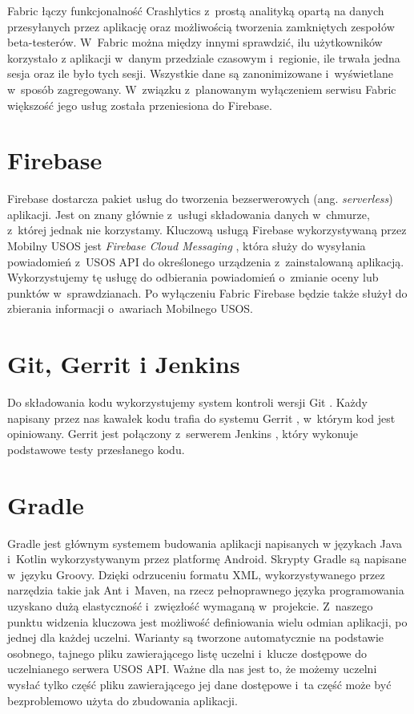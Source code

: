 \documentclass{pracamgr}
\begin{document}
Fabric \cite{fabric} łączy funkcjonalność Crashlytics z~prostą analityką opartą na
danych przesyłanych przez aplikację oraz możliwością tworzenia zamkniętych zespołów
beta-testerów. W~Fabric można między innymi sprawdzić, ilu użytkowników korzystało
z aplikacji w~danym przedziale czasowym i~regionie, ile trwała jedna sesja oraz
ile było tych sesji. Wszystkie dane są zanonimizowane i~wyświetlane w~sposób
zagregowany. W~związku z~planowanym wyłączeniem serwisu Fabric większość jego
usług została przeniesiona do Firebase.

\section{Firebase}

Firebase \cite{firebase} dostarcza pakiet usług do tworzenia bezserwerowych
(ang. \textit{serverless}) aplikacji. Jest on znany głównie z~usługi składowania
danych w~chmurze, z~której jednak nie korzystamy. Kluczową usługą Firebase
wykorzystywaną przez Mobilny USOS jest \textit{Firebase Cloud Messaging}
\cite{firebasecm}, która służy do wysyłania powiadomień z~USOS API do określonego
urządzenia z~zainstalowaną aplikacją. Wykorzystujemy tę usługę do odbierania
powiadomień o~zmianie oceny lub punktów w~sprawdzianach. Po wyłączeniu Fabric
Firebase będzie także służył do zbierania informacji o~awariach Mobilnego USOS.

\section{Git, Gerrit i Jenkins}

Do składowania kodu wykorzystujemy system kontroli wersji Git \cite{git}. Każdy
napisany przez nas kawałek kodu trafia do systemu Gerrit \cite{gerrit}, w~którym
kod jest opiniowany. Gerrit jest połączony z~serwerem Jenkins
\cite{jenkins}, który wykonuje podstawowe testy przesłanego kodu.

\section{Gradle}

Gradle \cite{gradle} jest głównym systemem budowania aplikacji napisanych w
językach Java i~Kotlin wykorzystywanym przez platformę Android. Skrypty Gradle
są napisane w~języku Groovy. Dzięki odrzuceniu formatu XML, wykorzystywanego przez
narzędzia takie jak Ant i~Maven, na rzecz pełnoprawnego języka programowania
uzyskano dużą elastyczność i~zwięzłość wymaganą w~projekcie. Z~naszego
punktu widzenia kluczowa jest możliwość definiowania wielu odmian aplikacji, po
jednej dla każdej uczelni. Warianty są tworzone automatycznie na podstawie osobnego,
tajnego pliku zawierającego listę uczelni i~klucze dostępowe do uczelnianego serwera
USOS API. Ważne dla nas jest to, że możemy uczelni wysłać tylko część pliku zawierającego
jej dane dostępowe i~ta część może być bezproblemowo użyta do zbudowania aplikacji.
\end{document}
